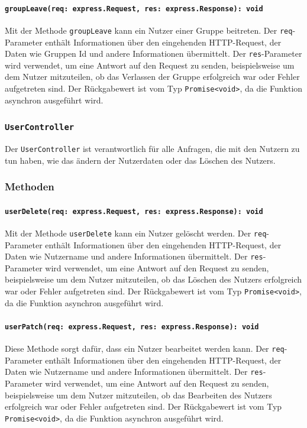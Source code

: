 \documentclass{entwurfsheft}
\begin{document}
\paragraph{\texttt{groupLeave(req: express.Request, res: express.Response): void}}
Mit der Methode \texttt{groupLeave} kann ein Nutzer einer Gruppe beitreten. Der \texttt{req}-Parameter enthält Informationen über den eingehenden HTTP-Request, der Daten wie Gruppen Id und andere Informationen übermittelt. Der \texttt{res}-Parameter wird verwendet, um eine Antwort auf den Request zu senden, beispielsweise um dem Nutzer mitzuteilen, ob das Verlassen der Gruppe erfolgreich war oder Fehler aufgetreten sind.
Der Rückgabewert ist vom Typ \texttt{Promise<void>}, da die Funktion asynchron ausgeführt wird.

\subsubsection{\texttt{UserController}}\label{sec:UserController}
Der \texttt{UserController} ist verantwortlich für alle Anfragen, die mit den Nutzern zu tun haben, wie das ändern der Nutzerdaten oder das Löschen des Nutzers.
\subsubsection*{Methoden}
\paragraph{\texttt{userDelete(req: express.Request, res: express.Response): void}}
Mit der Methode \texttt{userDelete} kann ein Nutzer gelöscht werden. Der \texttt{req}-Parameter enthält Informationen über den eingehenden HTTP-Request, der Daten wie Nutzername und andere Informationen übermittelt. Der \texttt{res}-Parameter wird verwendet, um eine Antwort auf den Request zu senden, beispielsweise um dem Nutzer mitzuteilen, ob das Löschen des Nutzers erfolgreich war oder Fehler aufgetreten sind.
Der Rückgabewert ist vom Typ \texttt{Promise<void>}, da die Funktion asynchron ausgeführt wird.
\paragraph{\texttt{userPatch(req: express.Request, res: express.Response): void}}
Diese Methode sorgt dafür, dass ein Nutzer bearbeitet werden kann. Der \texttt{req}-Parameter enthält Informationen über den eingehenden HTTP-Request, der Daten wie Nutzername und andere Informationen übermittelt. Der \texttt{res}-Parameter wird verwendet, um eine Antwort auf den Request zu senden, beispielsweise um dem Nutzer mitzuteilen, ob das Bearbeiten des Nutzers erfolgreich war oder Fehler aufgetreten sind.
Der Rückgabewert ist vom Typ \texttt{Promise<void>}, da die Funktion asynchron ausgeführt wird.
\end{document}
